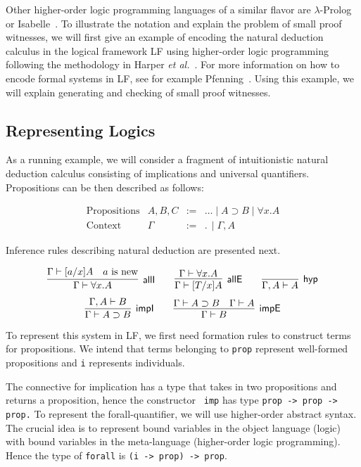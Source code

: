 \documentclass{llncs}
\newcommand{\impl}{\supset}
\newcommand{\ldot}{.\,}
\begin{document}
Other higher-order logic programming languages of a similar flavor are
$\lambda$-Prolog~\cite{Nadathur99cade} or
Isabelle~\cite{Paulson86}. To illustrate the notation and explain the
problem of small proof witnesses, we will first give an example of
encoding the natural deduction calculus in the logical framework LF
using higher-order logic programming following the methodology in
Harper {\em et al.}~\cite{Harper93jacm}. For more information on how to
encode formal systems in LF, see for example
Pfenning~\cite{Pfenning97}.  Using this example, we will explain
generating and checking of small proof witnesses.

\subsection{Representing Logics}
As a running example, we will consider a fragment of intuitionistic natural
deduction calculus consisting of implications and universal quantifiers. Propositions can
be then described as follows:

\[
\begin{array}{llll}
\mbox{Propositions} & A,B, C & := & \ldots \mid A \impl B \mid \forall x.A \\
\mbox{Context} & \Gamma & := & \ldot \mid \Gamma,  A
\end{array}
\]

Inference rules describing natural deduction are presented next.


\[
\infer[{\textsf{allI}}]{\Gamma\vdash \forall x. A}
{\Gamma\vdash [a/x]A & a \mbox{ is new}}
\qquad
\infer[{\textsf{allE}}]{\Gamma\vdash [T/x]A}
{\Gamma\vdash \forall x.A}
\qquad
\infer[{\textsf{hyp}}]{\Gamma, A \vdash A}
{}
\]
\[
\infer[{\textsf{impI}}]{\Gamma\vdash A\impl B}
{\Gamma,A\vdash B}
\qquad
\infer[{\textsf{impE}}]{\Gamma\vdash B}
{\Gamma\vdash A\impl B
\quad
\Gamma\vdash A}
\]

To represent this system in LF, we first need formation rules to
construct terms for propositions.  We intend that terms belonging to
{\tt prop} represent well-formed propositions and {\tt i} represents individuals.  

The connective for implication has a type that takes in two
propositions and returns a proposition, hence the constructor {\tt
imp} has type {\tt prop -> prop -> prop.} To represent the
forall-quantifier, we will use higher-order abstract syntax. The
crucial idea is to represent bound variables in the object language
(logic) with bound variables in the meta-language (higher-order logic
programming). Hence the type of {\tt forall} is {\tt (i -> prop) ->
prop}.
\end{document}
